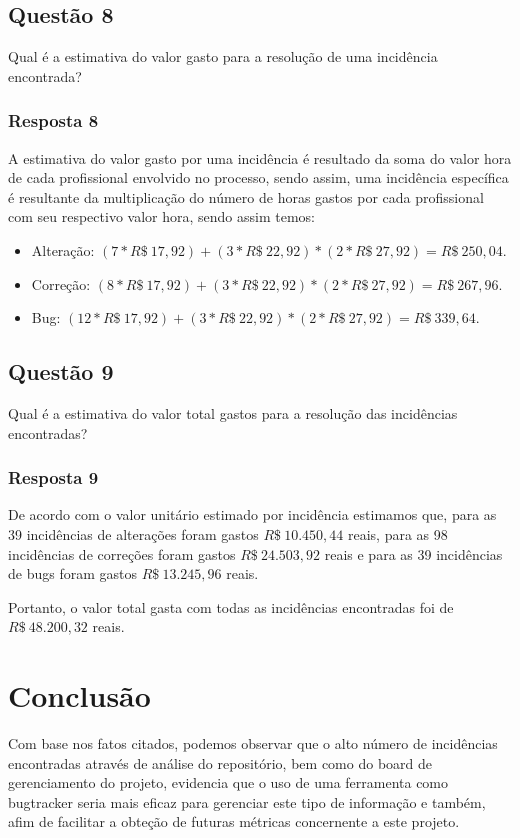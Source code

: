 \documentclass[11pt, a4paper]{article}
\begin{document}
\subsection{Questão 8}
Qual é a estimativa do valor gasto para a resolução de uma incidência encontrada?

\subsubsection{Resposta 8}
A estimativa do valor gasto por uma incidência é resultado da soma do valor hora de cada profissional envolvido no processo, sendo assim, uma incidência específica é resultante da multiplicação do número de horas gastos por cada profissional com seu respectivo valor hora, sendo assim temos:

\begin{itemize}
	\item Alteração: $(7 * R\$~17,92) +  (3 * R\$~22,92) * (2 * R\$~27,92) = R\$~250,04$.
	\item Correção: $(8 * R\$~17,92) +  (3 * R\$~22,92) * (2 * R\$~27,92) = R\$~267,96$.
	\item Bug: $(12 * R\$~17,92) +  (3 * R\$~22,92) * (2 * R\$~27,92) = R\$~339,64$.
\end{itemize}

\subsection{Questão 9}
Qual é a estimativa do valor total gastos para a resolução das incidências encontradas?

\subsubsection{Resposta 9}
De acordo com o valor unitário estimado por incidência estimamos que, para as 39 incidências de alterações foram gastos $R\$~10.450,44$ reais, para as 98 incidências de correções foram gastos $R\$~24.503,92$ reais e para as 39 incidências de bugs foram gastos $R\$~13.245,96$ reais.

Portanto, o valor total gasta com todas as incidências encontradas foi de  $R\$~48.200,32$ reais.

\section{Conclusão}
Com base nos fatos citados, podemos observar que o alto número de incidências encontradas através de análise do repositório, bem como do board de gerenciamento do projeto, evidencia que o uso de uma ferramenta como bugtracker seria mais eficaz para gerenciar este tipo de informação e também, afim de facilitar a obteção de futuras métricas concernente a este projeto.
\end{document}
